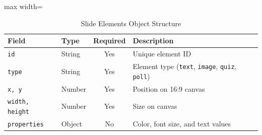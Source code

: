 \begin{table}[H]
\centering
\caption{Slide Elements Object Structure}
\label{tab:elemschema}
\begin{adjustbox}{max width=\textwidth}
\begin{tabular}{llcl}
\toprule
\textbf{Field} & \textbf{Type} & \textbf{Required} & \textbf{Description} \\
\midrule
\texttt{id} & String & Yes & Unique element ID \\
\texttt{type} & String & Yes & Element type (\texttt{text}, \texttt{image}, \texttt{quiz}, \texttt{poll}) \\
\texttt{x, y} & Number & Yes & Position on 16:9 canvas \\
\texttt{width, height} & Number & Yes & Size on canvas \\
\texttt{properties} & Object & No & Color, font size, and text values \\
\bottomrule
\end{tabular}
\end{adjustbox}
\end{table}